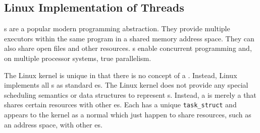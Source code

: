 \subsection{Linux Implementation of Threads}\label{subsec:Linux_Implementation_Threads}
s are a popular modern programming abstraction.
They provide multiple executors within the same program in a shared memory address space.
They can also share open files and other resources.
s enable concurrent programming and, on multiple processor systems, true parallelism.

The Linux kernel is unique in that there is no concept of a .
Instead, Linux implements all s as standard es.
The Linux kernel does not provide any special scheduling semantics or data structures to represent s.
Instead, a  is merely a  that shares certain resources with other es.
Each  has a unique \texttt{task_struct} and appears to the kernel as a normal  which just happen to share resources, such as an address space, with other es.



